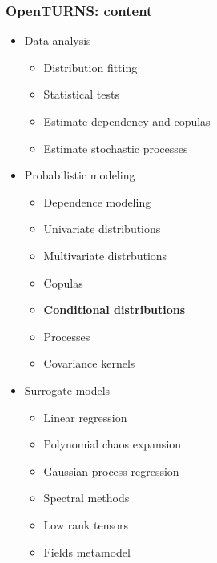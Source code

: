 \documentclass{beamer}
\begin{document}
\begin{frame}[containsverbatim]
  \frametitle{OpenTURNS: content}
  
  \begin{scriptsize}
  
  \begin{minipage}[t]{0.33\textwidth}
  \begin{itemize}
  \item Data analysis
  \begin{itemize}
  \tiny
  \item Distribution fitting
  \item Statistical tests
  \item Estimate dependency and copulas
  \item Estimate stochastic processes
  \end{itemize}
  \end{itemize}
  \end{minipage}%
  \begin{minipage}[t]{0.33\textwidth}
  \begin{itemize}
  \item Probabilistic modeling
  \begin{itemize}
  \tiny
  \item Dependence modeling
  \item Univariate distributions
  \item Multivariate distrbutions
  \item Copulas
  \item \textbf{Conditional distributions}
  \item Processes 
  \item Covariance kernels
  \end{itemize}
  \end{itemize}
  \end{minipage}%
  \begin{minipage}[t]{0.33\textwidth}
  \begin{itemize}
  \item Surrogate models
  \begin{itemize}
  \tiny
  \item Linear regression
  \item Polynomial chaos expansion
  \item Gaussian  process regression
  \item Spectral methods
  \item Low rank tensors
  \item Fields metamodel
  \end{itemize}
  \end{itemize}
  \end{minipage}
  

\end{scriptsize}
\end{frame}
\end{document}
